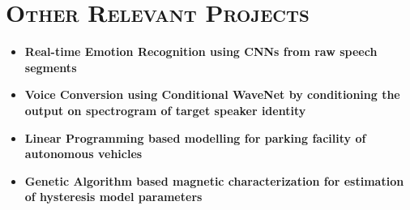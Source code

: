 \documentclass[a4paper,10pt]{article}
\newlength{\itemgap}
\newlength{\itembefore}
\newlength{\otherProjectsSubsectionGap}
\newcommand\scl{1.05}
\begin{document}
\section{\scshape{Other Relevant Projects}}
\vspace{1}

\begin{itemize}[topsep=\itembefore,itemsep=\itemgap,partopsep=0pt, parsep=0pt]
  
  \item \textbf {Real-time Emotion Recognition using CNNs from raw speech segments}
  \item \textbf {Voice Conversion using Conditional WaveNet by conditioning the output on spectrogram of target speaker identity}
  \item \textbf {Linear Programming based modelling for parking facility of autonomous vehicles}
  \item \textbf {Genetic Algorithm based magnetic characterization for estimation of hysteresis model parameters}
  
\end{itemize}


\end{document}
